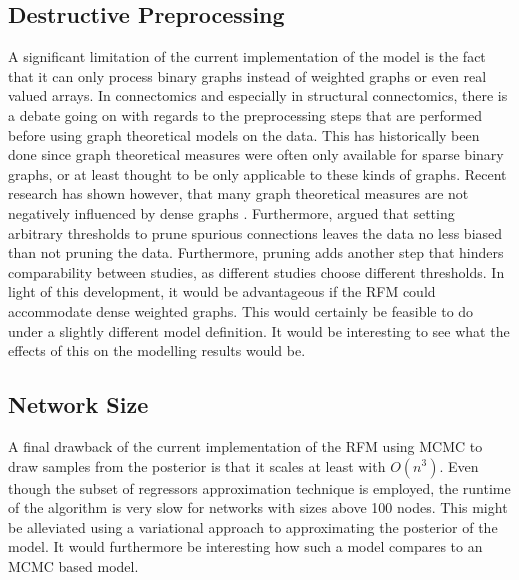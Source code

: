 \documentclass[11pt]{report} %
\begin{document}
\subsection{Destructive Preprocessing}
A significant limitation of the current implementation of the model is the fact that it can only process binary graphs instead of weighted graphs or even real valued arrays. In connectomics and especially in structural connectomics, there is a debate going on with regards to the preprocessing steps that are performed before using graph theoretical models on the data. This has historically been done since graph theoretical measures were often only available for sparse binary graphs, or at least thought to be only applicable to these kinds of graphs. Recent research has shown however, that many graph theoretical measures are not negatively influenced by dense graphs \cite{civier2019}. Furthermore,  argued that setting arbitrary thresholds to prune spurious connections leaves the data no less biased than not pruning the data. Furthermore, pruning adds another step that hinders comparability between studies, as different studies choose different thresholds. In light of this development, it would be advantageous if the RFM could accommodate dense weighted graphs. This would certainly be feasible to do under a slightly different model definition. It would be interesting to see what the effects of this on the modelling results would be.
\subsection{Network Size}
A final drawback of the current implementation of the RFM using MCMC to draw samples from the posterior is that it scales at least with $O(n^3)$. Even though the subset of regressors approximation technique is employed, the runtime of the algorithm is very slow for networks with sizes above 100 nodes. This might be alleviated using a variational approach to approximating the posterior of the model. It would furthermore be interesting how such a model compares to an MCMC based model. 
\end{document}
